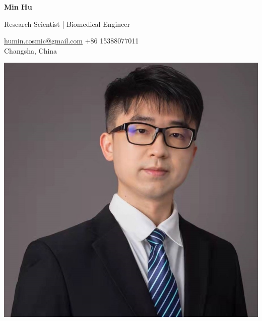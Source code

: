 \documentclass[11pt, a4paper]{scrartcl}
\begin{document}
\noindent
\begin{minipage}[t]{0.75\linewidth}
    \vspace{0pt} %
    {\Huge\bfseries Min Hu}
    \vspace{1.0ex}
    
    {\large Research Scientist | Biomedical Engineer}
    \vspace{2.0ex}
    
    \small
    \href{mailto:humin.cosmic@gmail.com}{humin.cosmic@gmail.com} \quad\textbar\quad +86 15388077011 \\
    Changsha, China
\end{minipage}%
\hfill%
\begin{minipage}[t]{0.2\linewidth}
    \vspace{0pt} %
    \includegraphics[width=\linewidth, clip]{photo.jpg}
\end{minipage}
\vspace{2ex}


\end{document}

